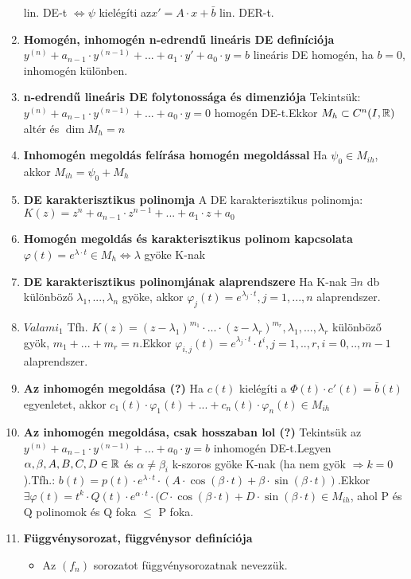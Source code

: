 \documentclass{article}
\begin{document}
\begin{enumerate}
	lin. DE-t $\Leftrightarrow\psi$ kielégíti az\br$x'=A\cdot x+\bar{b}$ lin. DER-t.
	\item\textbf{Homogén, inhomogén n-edrendű lineáris DE definíciója}\br
	$y^{(n)}+a_{n-1}\cdot y^{(n-1)}+...+a_1\cdot y'+a_0\cdot y = b$ lineáris DE
	homogén, ha $b=0$, inhomogén különben.
	\item\textbf{n-edrendű lineáris DE folytonossága és dimenziója}\br
	Tekintsük: $y^{(n)}+a_{n-1}\cdot y^{(n-1)}+...+a_0\cdot y=0$
	homogén DE-t.\br Ekkor $M_h\subset C^n (I, \mathbb{R})$ altér és $\dim M_h=n$
	\item\textbf{Inhomogén megoldás felírása homogén megoldással}\br
	Ha $\psi_0\in M_{ih}$, akkor $M_{ih}=\psi_0+M_h$
	\item\textbf{DE karakterisztikus polinomja}\br
	A DE karakterisztikus polinomja: $K(z)=z^n+a_{n-1}\cdot z^{n-1}+...+a_1
	\cdot z+a_0$
	\item\textbf{Homogén megoldás és karakterisztikus polinom kapcsolata}\br
	$\varphi(t)=e^{\lambda\cdot t}\in M_h \Leftrightarrow\lambda$ gyöke K-nak
	\item\textbf{DE karakterisztikus polinomjának alaprendszere}\br
	Ha K-nak $\exists n$ db különböző $\lambda_1, ... , \lambda_n$ gyöke, akkor
	$\varphi_{j}(t)=e^{\lambda_j\cdot t},j=1,...,n$ alaprendszer.
	\item\textbf{$Valami_1$}\br
	Tfh. $K(z)=(z-\lambda_1)^{m_1}\cdot...\cdot(z-\lambda_r)^{m_r},\lambda_1,
	... ,\lambda_r$ különböző gyök, $m_1 + ... + m_r = n$.\br Ekkor
	$\varphi_{i,j}(t)=e^{\lambda_j\cdot t}\cdot t^i,j=1,..,r,i=0,..,m-1$
	alaprendszer.
	\item\textbf{Az inhomogén megoldása (?)}\br
	Ha $c(t)$ kielégíti a $\Phi(t)\cdot c'(t) = \bar{b}(t)$ egyenletet, akkor
	$c_1(t)\cdot\varphi_1(t)+...+c_n(t)\cdot\varphi_n(t)\in M_{ih}$
	\item\textbf{Az inhomogén megoldása, csak hosszaban lol (?)}\br
	Tekintsük az $y^{(n)}+a_{n-1}\cdot y^{(n-1)}+...+a_0\cdot y=b$ inhomogén
	DE-t.\br Legyen $\alpha,\beta,A,B,C,D\in\mathbb{R}$ és $\alpha\neq\beta_i$ k-szoros
	gyöke K-nak (ha nem gyök $\Rightarrow k=0$).\br Tfh.: $b(t)=p(t)\cdot
	e^{\lambda\cdot t}\cdot(A\cdot \cos(\beta\cdot t)+\beta\cdot\sin(\beta\cdot
	t)).$\br Ekkor $\exists\varphi(t)=t^k\cdot Q(t)\cdot e^{\alpha\cdot t}
	\cdot(C\cdot\cos(\beta\cdot t)+D\cdot\sin(\beta\cdot t)\in M_{ih}$,
	\br ahol P és Q polinomok és Q foka $\leq$ P foka.
	\newpage
	\item\textbf{Függvénysorozat, függvénysor definíciója}
	\begin{itemize}
		\item Az $(f_n)$ sorozatot függvénysorozatnak nevezzük.

\end{itemize}
\end{enumerate}
\end{document}
